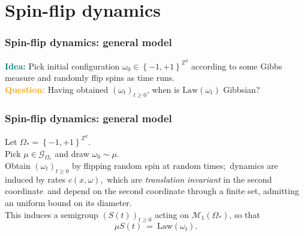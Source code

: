 \documentclass{beamer}
\newcommand{\G}{\mathcal{G}}
\newcommand{\M}{\mathcal{M}}
\newcommand{\Z}{\mathbb{Z}}
\newcommand{\set}[1]{\left\{#1\right\}}
\newcommand{\1}{\mathbbm{1}}
\newcommand{\5}{\vspace{0.5cm}}
\newcommand{\3}{\vspace{0.3cm}}
\theoremstyle{definition}
\begin{document}

\section{Spin-flip dynamics}


\begin{frame}
\frametitle{Spin-flip dynamics: general model}
\textcolor{teal}{\textbf{Idea:}} Pick initial configuration $\omega_0\in\set{-1,+1}^{\Z^d}$ according to some Gibbs measure and randomly flip spins as time runs. \\\vspace{0.5cm}\pause
\textcolor{orange}{\textbf{Question:}} Having obtained $(\omega_t)_{t\geq 0}$, when is $\mathrm{Law}(\omega_t)$ Gibbsian?
\end{frame}

\begin{frame}
\frametitle{Spin-flip dynamics: general model}
Let $\Omega_*=\set{-1,+1}^{\Z^d}$.\\\vspace{0.5cm}\pause
Pick $\mu\in\G_{\Omega_*}$ and draw $\omega_0\sim\mu$. \\\vspace{0.5cm}\pause
Obtain $(\omega_t)_{t\geq 0}$ by flipping random spin at random times;\pause~dynamics are induced by rates $c(x,\omega)$,\pause~which are \textit{translation invariant} in the second coordinate\pause~and depend on the second coordinate through a finite set, admitting an uniform bound on its diameter. \\\pause\vspace*{0.5cm}
This induces a semigroup $(S(t))_{t\geq 0}$ acting on $\M_1(\Omega_*)$, so that
$$\mu S(t) ~=~ \mathrm{Law}(\omega_t).$$
\end{frame}

\end{document}
